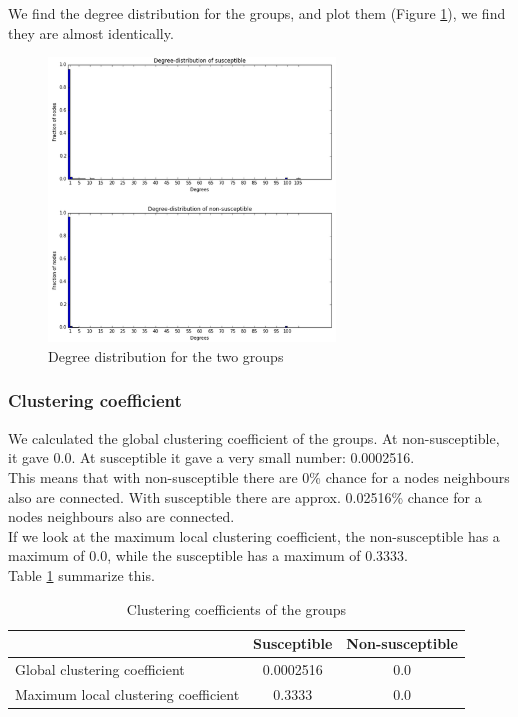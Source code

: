 \documentclass[10pt]{IEEEtran}
\begin{document}
We find the degree distribution for the groups, and plot them (Figure \ref{fig:degree_distribution}), we find they are almost identically. 
\begin{figure}[H]
  \centering
  \includegraphics[width=3.0in]{degree_distribution}
  \caption{Degree distribution for the two groups}
  \label{fig:degree_distribution}
\end{figure}


\subsubsection{Clustering coefficient}
We calculated the global clustering coefficient of the groups. At non-susceptible, it gave 0.0. At susceptible it gave a very small number: 0.0002516.\\

This means that with non-susceptible there are 0\% chance for a nodes neighbours also are connected. 
With susceptible there are approx. 0.02516\% chance for a nodes neighbours also are connected. \\
If we look at the maximum local clustering coefficient, the non-susceptible has a maximum of 0.0, while the susceptible has a maximum of 0.3333. \\
Table \ref{tab:clustering_coefficient} summarize this. 
\begin{table}[H]
\centering
\begin{tabular}{lcc}
\hline
                      & Susceptible & Non-susceptible \\ \hline
Global clustering coefficient & 0.0002516 & 0.0           \\
Maximum local clustering coefficient          & 0.3333        & 0.0     \\ \hline
\end{tabular}
\caption{Clustering coefficients of the groups}
\label{tab:clustering_coefficient}
\end{table}
\end{document}
